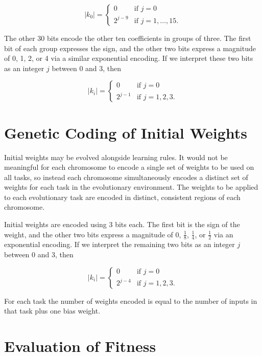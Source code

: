 \documentclass[master]{outhesis}
\begin{document}
\[
	|k_0|=
	\begin{cases}
		0 & \text{if $j = 0$}\\
		2^{j-9} & \text{if $j = 1, ..., 15$.}
	\end{cases}
\]

The other 30 bits encode the other ten coefficients in groups of three. The first bit of each group expresses the sign, and the other two bits express a magnitude of 0, 1, 2, or 4 via a similar exponential encoding. If we interpret these two bits as an integer $j$ between 0 and 3, then

\[
	|k_i|=
	\begin{cases}
		0 & \text{if $j = 0$}\\
		2^{j-1} & \text{if $j = 1, 2, 3$.}
	\end{cases}
\]

\section{Genetic Coding of Initial Weights}

Initial weights may be evolved alongside learning rules. It would not be meaningful for each chromosome to encode a single set of weights to be used on all tasks, so instead each chromosome simultaneously encodes a distinct set of weights for each task in the evolutionary environment. The weights to be applied to each evolutionary task are encoded in distinct, consistent regions of each chromosome. 

\newcommand{\bitsperweight}{3}
\newcommand{\jlen}{2}
\newcommand{\jmin}{0}
\newcommand{\jmax}{3}
\newcommand{\exponentshift}{4}

Initial weights are encoded using 3 bits each. The first bit is the sign of the weight, and the other two bits express a magnitude of 0, $\frac{1}{8}$, $\frac{1}{4}$, or $\frac{1}{2}$ via an exponential encoding. If we interpret the remaining two bits as an integer $j$ between 0 and 3, then

\[
	|k_i|=
	\begin{cases}
		0 & \text{if $j = 0$}\\
		2^{j-4} & \text{if $j = 1, 2, 3$.}
	\end{cases}
\]

For each task the number of weights encoded is equal to the number of inputs in that task plus one bias weight.

\section{Evaluation of Fitness}
\end{document}
